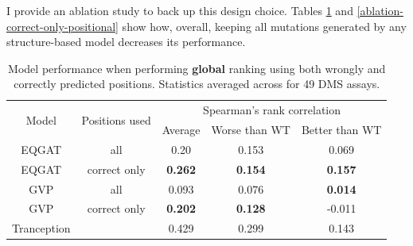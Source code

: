 I provide an ablation study to back up this design choice. Tables \ref{ablation-correct-only-global} and \ref{ablation-correct-only-positional} show how, overall, keeping all mutations generated by any structure-based model decreases its performance. 

\begin{table}[!hbt]
\caption{Model performance when performing \textbf{global} ranking using both wrongly and correctly predicted positions. Statistics averaged across for 49 DMS assays.}
\label{ablation-correct-only-global}
\vskip 0.15in
\begin{center}
\begin{small}
\begin{sc}
\begin{tabular}{@{}ccccc@{}}
\toprule
\multirow{2}{*}{Model} & \multirow{2}{*}{Positions used} & \multicolumn{3}{c}{Spearman's rank correlation}  \\ \cmidrule(l){3-5} 
                       &                                 & Average        & Worse than WT  & Better than WT \\ \midrule
EQGAT                  & all                             & 0.20           & 0.153          & 0.069          \\
EQGAT                  & correct only                    & \textbf{0.262} & \textbf{0.154} & \textbf{0.157} \\ \midrule
GVP                    & all                             & 0.093          & 0.076          & \textbf{0.014} \\
GVP                    & correct only                    & \textbf{0.202} & \textbf{0.128} & -0.011         \\ \midrule
Tranception            &                                 & 0.429          & 0.299          & 0.143          \\ \bottomrule
\end{tabular}
\end{sc}
\end{small}
\end{center}
\vskip -0.1in
\end{table}

